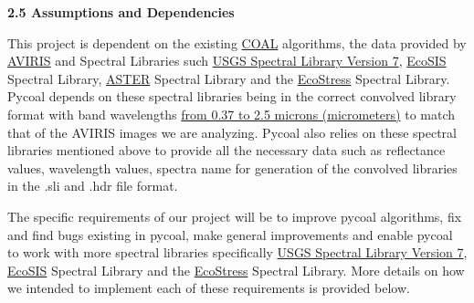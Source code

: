 \documentclass[a4paper,12pt]{article}
\begin{document}
\noindent \textbf{2.5 Assumptions and Dependencies}\newline


\noindent This project is dependent on the existing \href{https://capstone-coal.github.io/}{COAL} algorithms, the data provided by \href{https://aviris.jpl.nasa.gov/}{AVIRIS} and Spectral Libraries such \href{https://speclab.cr.usgs.gov/spectral-lib.html}{USGS Spectral Library Version 7}, \href{https://ecosis.org/}{EcoSIS} Spectral Library, \href{https://speclib.jpl.nasa.gov/downloads/2009-Baldridge.pdf}{ASTER} Spectral Library and the \href{https://speclib.jpl.nasa.gov/}{EcoStress} Spectral Library.\newline
\newline
Pycoal depends on these spectral libraries being in the correct convolved library format with band wavelengths \href{https://pubs.usgs.gov/of/2001/ofr-01-0405/ofr-01-0405.html}{from 0.37 to 2.5 microns (micrometers)} to match that of the AVIRIS images we are analyzing. Pycoal also relies on these spectral libraries mentioned above to provide all the necessary data such as reflectance values, wavelength values, spectra name for generation of the convolved libraries in the .sli and .hdr file format. \newline


\newline


\noindent  The specific requirements of our project will be to improve pycoal algorithms, fix and find bugs existing in pycoal, make general improvements and enable pycoal to work with more spectral libraries specifically \href{https://speclab.cr.usgs.gov/spectral-lib.html}{USGS Spectral Library Version 7}, \href{https://ecosis.org/}{EcoSIS} Spectral Library and the \href{https://speclib.jpl.nasa.gov/}{EcoStress} Spectral Library. More details on how we intended to implement each of these requirements is provided below. \newline
\end{document}
